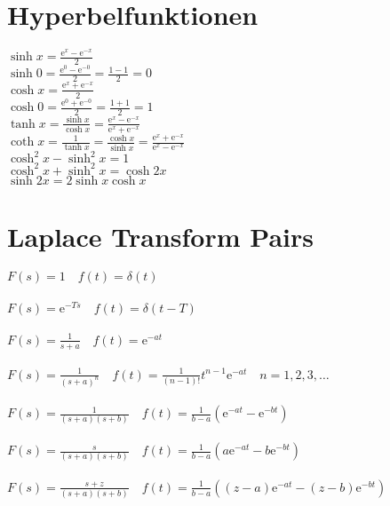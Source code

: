 \documentclass[a4paper, 10pt]{scrartcl}
\newcommand*\euler{\mathrm{e}}
\begin{document}
\section*{Hyperbelfunktionen}
$\sinh{x} = \frac{\euler^{x} - \euler^{-x}}{2}$\\
$\sinh{0} = \frac{\euler^{0} - \euler^{-0}}{2} = \frac{1 - 1}{2} = 0$\\
$\cosh{x} = \frac{\euler^{x} + \euler^{-x}}{2}$\\
$\cosh{0} = \frac{\euler^{0} + \euler^{-0}}{2} = \frac{1 + 1}{2} = 1$\\
$\tanh{x} = \frac{\sinh{x}}{\cosh{x}} = \frac{\euler^{x} - \euler^{-x}}{\euler^{x} + \euler^{-x}}$\\
$\coth{x} = \frac{1}{\tanh{x}} = \frac{\cosh{x}}{\sinh{x}} = \frac{\euler^{x} + \euler^{-x}}{\euler^{x} - \euler^{-x}}$\\
$\cosh^{2}{x} - \sinh^{2}{x} = 1$\\
$\cosh^{2}{x} + \sinh^{2}{x} = \cosh{2x}$\\
$\sinh{2x} = 2\sinh{x}\cosh{x}$\\

\section*{Laplace Transform Pairs}
$F(s) = 1 \quad f(t) = \delta(t)$\\
\\
$F(s) = \euler^{-Ts} \quad f(t) = \delta(t - T)$\\
\\
$F(s) = \frac{1}{s + a} \quad f(t) = \euler^{-at}$\\
\\
$F(s) = \frac{1}{(s + a)^{n}} \quad f(t) = \frac{1}{(n - 1)!}t^{n - 1}\euler^{-at} \quad n = 1, 2, 3,\dots $\\
\\
$F(s) = \frac{1}{(s + a)(s + b)} \quad f(t) = \frac{1}{b - a}(\euler^{-at} - \euler^{-bt})$\\
\\
$F(s) = \frac{s}{(s + a)(s + b)} \quad f(t) = \frac{1}{b - a}(a\euler^{-at} - b\euler^{-bt})$\\
\\
$F(s) = \frac{s + z}{(s + a)(s + b)} \quad f(t) = \frac{1}{b - a}((z - a)\euler^{-at} - (z - b)\euler^{-bt})$\\
\end{document}
